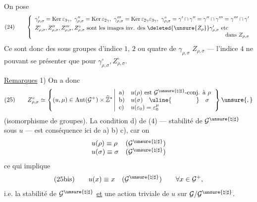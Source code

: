 On pose
\[
(24)\qquad
\left\{
\begin{array}{l}
\gamma'_{\rho,\sigma}=\operatorname{Ker}\varepsilon_{3\gamma},\
\gamma''_{\rho,\sigma}=\operatorname{Ker}\varepsilon_{2\gamma},\
\gamma'''_{\rho,\sigma}=\operatorname{Ker}\varepsilon_{2\gamma}\varepsilon_{3\gamma},\
\gamma^\circ_{\rho,\sigma}=\gamma'\cap\gamma''=\gamma''\cap\gamma'''
=\gamma'''\cap\gamma'\\[4pt]
Z'_{\rho,\sigma},Z''_{\rho,\sigma},Z'''_{\rho,\sigma},Z^\circ_{\rho,\sigma}
\text{ sont les images inv. des }\deleted{\unsure{Z_\rho}}
\gamma'_{\rho,\sigma}\text{ etc}\\
\hfill\text{dans }Z_{\rho,\sigma}
\end{array}
\right.
\]
Ce sont donc des sous groupes d'indice $1$,  $2$ ou quatre de
$\gamma_{\rho,\sigma}$  $Z_{\rho,\sigma}$ --- l'indice $4$ ne pouvant
se présenter que pour $\gamma^\circ_{\rho,\sigma},Z^\circ_{\rho,\sigma}$.

\uline{Remarques} 1) On a donc
\[
(25)\qquad
Z^\circ_{\rho,\sigma}\simeq
\left\{
(u,\mu)\in\operatorname{Aut}(\mathcal{G}^{+})\times\widehat{\mathbb{Z}}^{*}
\left|
\begin{array}{ll}
\mathrm{a})&u(\rho)\text{ est }\mathcal{G}^{\unsure{\natural|\sharp}}\text{-conj. à }\rho\\
\mathrm{b})&u(\sigma)\quad\uline{\hspace{4em}}\quad\sigma\\
\mathrm{c})&u(\varepsilon_0)=\varepsilon_0^\mu
\end{array}
\right.
\right\}\unsure{,}
\]
(isomorphisme de  groupes). La condition d) de (4) ---
stabilité de $\mathcal{G}^{\unsure{\natural|\sharp}}$ sous $u$ --- est conséquence
ici de a) b) c), car on 
\[
\begin{array}{ll}
u(\rho)\equiv\rho&(\mathcal{G}^{\unsure{\natural|\sharp}})\\
u(\sigma)\equiv\sigma&(\mathcal{G}^{\unsure{\natural|\sharp}})
\end{array}
\]
ce qui implique
\[
(25\mathrm{bis})\qquad
u(x)\equiv x\quad(\mathcal{G}^{\unsure{\natural|\sharp}})
\qquad \forall x\in\mathcal{G}^{+},
\]
i.e. la stabilité de $\mathcal{G}^{\unsure{\natural|\sharp}}$ \uline{et} une action triviale de
$u$ sur $\mathcal{G}/\mathcal{G}^{\unsure{\natural|\sharp}}$.

